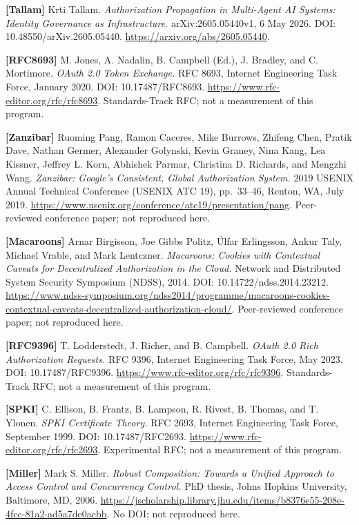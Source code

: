 \documentclass[
  10pt,
]{article}
\renewcommand{\_}{\allowbreak\origunderscore}
\begin{document}
\textbf{{[}Tallam{]}} Krti Tallam. \emph{Authorization Propagation in
Multi-Agent AI Systems: Identity Governance as Infrastructure.}
arXiv:2605.05440v1, 6 May 2026. DOI: 10.48550/arXiv.2605.05440.
\url{https://arxiv.org/abs/2605.05440}.

\textbf{{[}RFC8693{]}} M. Jones, A. Nadalin, B. Campbell (Ed.), J.
Bradley, and C. Mortimore. \emph{OAuth 2.0 Token Exchange.} RFC 8693,
Internet Engineering Task Force, January 2020. DOI: 10.17487/RFC8693.
\url{https://www.rfc-editor.org/rfc/rfc8693}. Standards-Track RFC; not a
measurement of this program.

\textbf{{[}Zanzibar{]}} Ruoming Pang, Ramon Caceres, Mike Burrows,
Zhifeng Chen, Pratik Dave, Nathan Germer, Alexander Golynski, Kevin
Graney, Nina Kang, Lea Kissner, Jeffrey L. Korn, Abhishek Parmar,
Christina D. Richards, and Mengzhi Wang. \emph{Zanzibar: Google's
Consistent, Global Authorization System.} 2019 USENIX Annual Technical
Conference (USENIX ATC 19), pp.~33--46, Renton, WA, July 2019.
\url{https://www.usenix.org/conference/atc19/presentation/pang}.
Peer-reviewed conference paper; not reproduced here.

\textbf{{[}Macaroons{]}} Arnar Birgisson, Joe Gibbs Politz, Úlfar
Erlingsson, Ankur Taly, Michael Vrable, and Mark Lentczner.
\emph{Macaroons: Cookies with Contextual Caveats for Decentralized
Authorization in the Cloud.} Network and Distributed System Security
Symposium (NDSS), 2014. DOI: 10.14722/ndss.2014.23212.
\url{https://www.ndss-symposium.org/ndss2014/programme/macaroons-cookies-contextual-caveats-decentralized-authorization-cloud/}.
Peer-reviewed conference paper; not reproduced here.

\textbf{{[}RFC9396{]}} T. Lodderstedt, J. Richer, and B. Campbell.
\emph{OAuth 2.0 Rich Authorization Requests.} RFC 9396, Internet
Engineering Task Force, May 2023. DOI: 10.17487/RFC9396.
\url{https://www.rfc-editor.org/rfc/rfc9396}. Standards-Track RFC; not a
measurement of this program.

\textbf{{[}SPKI{]}} C. Ellison, B. Frantz, B. Lampson, R. Rivest, B.
Thomas, and T. Ylonen. \emph{SPKI Certificate Theory.} RFC 2693,
Internet Engineering Task Force, September 1999. DOI: 10.17487/RFC2693.
\url{https://www.rfc-editor.org/rfc/rfc2693}. Experimental RFC; not a
measurement of this program.

\textbf{{[}Miller{]}} Mark S. Miller. \emph{Robust Composition: Towards
a Unified Approach to Access Control and Concurrency Control.} PhD
thesis, Johns Hopkins University, Baltimore, MD, 2006.
\url{https://jscholarship.library.jhu.edu/items/b8376e55-208e-4fcc-81a2-ad5a7de0acbb}.
No DOI; not reproduced here.
\end{document}
